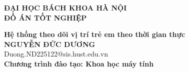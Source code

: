 \documentclass[DoAn.tex]{subfiles}
\begin{document}
\begin{titlepage}
\thispagestyle{empty}
\begin{center}

{\textbf{\large{ĐẠI HỌC BÁCH KHOA HÀ NỘI}}}\\[4cm]

{\textbf{\huge{ ĐỒ ÁN TỐT NGHIỆP}}}\\[1cm]
{\textbf{\Large{Hệ thống theo dõi vị trí trẻ em theo thời gian thực}}\\[1cm]

{\textbf{\large{NGUYỄN ĐỨC DƯƠNG}}}\\
{\large{Duong.ND225122@sis.hust.edu.vn}}\\[0.5cm]

{\textbf{\large{Chương trình đào tạo: Khoa học máy tính
}}}\\

\vspace{4cm}
\begin{table}[H]
\centering
{}
\end{table}}
\end{center}



\end{titlepage}
\end{document}
